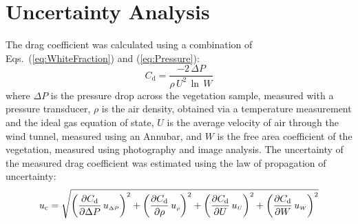 \documentclass[12pt]{article}
\begin{document}

\appendix
{}
\makeatletter
\newcommand{\section@cntformat}{Appendix:\ }
\makeatother
\section{Uncertainty Analysis} \label{sec:Uncertainty}

The drag coefficient was calculated using a combination of Eqs.~(\ref{eq:WhiteFraction}) and (\ref{eq:Pressure}):
\begin{equation}\label{eq:drag_coefficient}
  C_\mathrm{d} = \frac{-2 \, \Delta P}{\rho \, U^2 \, \ln \, W}
\end{equation}
where $\Delta P$ is the pressure drop across the vegetation sample, measured with a pressure transducer, $\rho$ is the air density, obtained via a temperature measurement and the ideal gas equation of state, $U$ is the average velocity of air through the wind tunnel, measured using an Annubar, and $W$ is the free area coefficient of the vegetation, measured using photography and image analysis. The uncertainty of the measured drag coefficient was estimated using the law of propagation of uncertainty:
\begin{equation}
\label{eq:DragUncertainty}
u_\mathrm{c} = \sqrt{{\left( \frac{\partial C_{\rm d}}{\partial \Delta P}\,u_{\scriptscriptstyle \Delta P} \right)}^2+{\left(\frac{\partial C_{\rm d}}{\partial \rho}\,u_{\scriptscriptstyle \rho}\right)}^2+{\left(\frac{\partial C_{\rm d}}{\partial U}\,u_{\scriptscriptstyle U}\right)}^2+{\left(\frac{\partial C_{\rm d}}{\partial W}\,u_{\scriptscriptstyle W}\right)}^2}
\end{equation}
\end{document}
